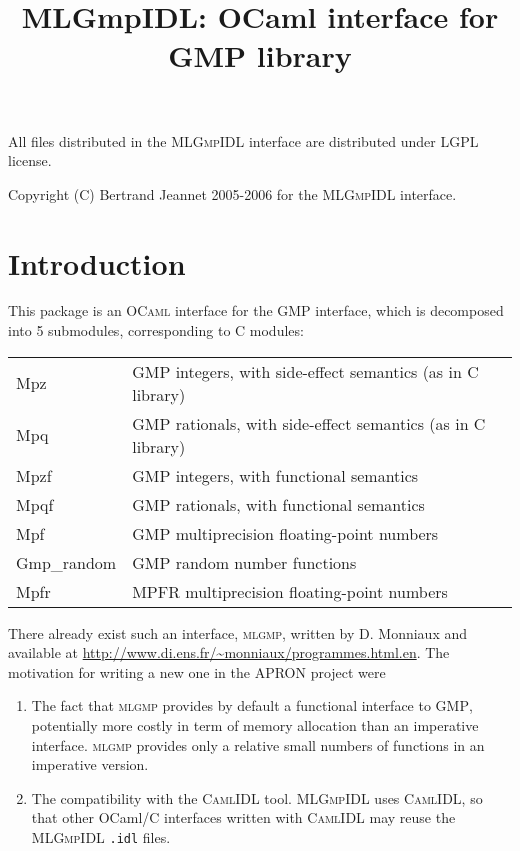 \documentclass[[twoside,10pt,a4paper]{report}
\title{MLGmpIDL: OCaml interface for GMP library}
\begin{document}
\maketitle


\vspace*{0.9\textheight}

All files distributed in the \textsc{MLGmpIDL} interface are
distributed under LGPL license.

Copyright (C) Bertrand Jeannet 2005-2006 for the
\textsc{MLGmpIDL} interface.

\newpage

\section*{Introduction}

This package is an \textsc{OCaml} interface for the GMP
interface, which is decomposed into 5 submodules, corresponding to C
modules:

\noindent
\begin{tabular}{l@{~:~~}l}
Mpz        & GMP integers, with side-effect semantics (as in C library) \\
Mpq        & GMP rationals, with side-effect semantics (as in C library) \\
Mpzf       & GMP integers, with functional semantics  \\
Mpqf       & GMP rationals, with functional semantics \\
Mpf        & GMP multiprecision floating-point numbers \\
Gmp\_random & GMP random number functions \\
Mpfr      & MPFR multiprecision floating-point numbers
\end{tabular}

There already exist such an interface, \textsc{mlgmp}, written by
D. Monniaux and available at
\url{http://www.di.ens.fr/~monniaux/programmes.html.en}. The
motivation for writing a new one in the APRON project were
\begin{enumerate}
\item The fact that \textsc{mlgmp} provides by default a
  functional interface to \textsc{GMP}, potentially more costly in
  term of memory allocation than an imperative interface.
  \textsc{mlgmp} provides only a relative small numbers of
  functions in an imperative version.
\item The compatibility with the \textsc{CamlIDL} tool.
  \textsc{MLGmpIDL} uses \textsc{CamlIDL}, so that other OCaml/C
  interfaces written with \textsc{CamlIDL} may reuse the
  \textsc{MLGmpIDL} \texttt{.idl} files.
\end{enumerate}
\end{document}
